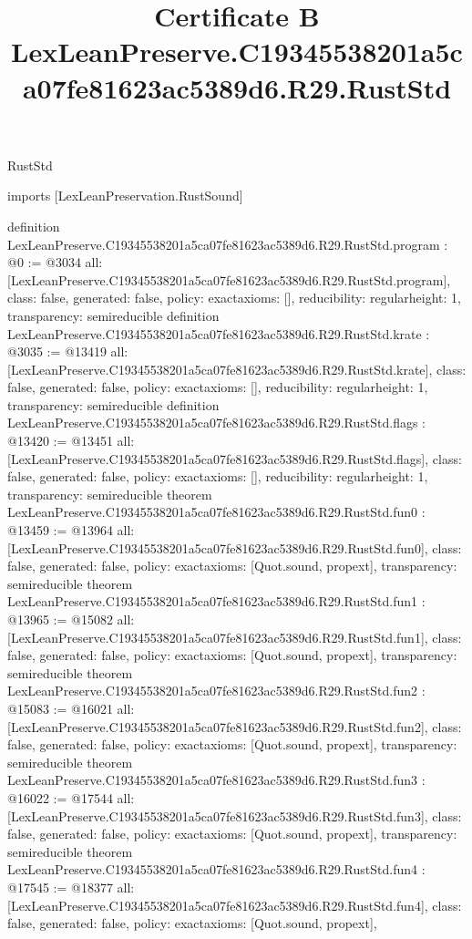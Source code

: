 \begin{lexlean}{RustStd}
\title{Certificate B LexLeanPreserve.C19345538201a5ca07fe81623ac5389d6.R29.RustStd}
\begin{coremodule}
imports [LexLeanPreservation.RustSound]

definition LexLeanPreserve.C19345538201a5ca07fe81623ac5389d6.R29.RustStd.program : @0 := @3034 {
  all: [LexLeanPreserve.C19345538201a5ca07fe81623ac5389d6.R29.RustStd.program],
  class: false,
  generated: false,
  policy: exact{axioms: []},
  reducibility: regular{height: 1},
  transparency: semireducible
}
definition LexLeanPreserve.C19345538201a5ca07fe81623ac5389d6.R29.RustStd.krate : @3035 := @13419 {
  all: [LexLeanPreserve.C19345538201a5ca07fe81623ac5389d6.R29.RustStd.krate],
  class: false,
  generated: false,
  policy: exact{axioms: []},
  reducibility: regular{height: 1},
  transparency: semireducible
}
definition LexLeanPreserve.C19345538201a5ca07fe81623ac5389d6.R29.RustStd.flags : @13420 := @13451 {
  all: [LexLeanPreserve.C19345538201a5ca07fe81623ac5389d6.R29.RustStd.flags],
  class: false,
  generated: false,
  policy: exact{axioms: []},
  reducibility: regular{height: 1},
  transparency: semireducible
}
theorem LexLeanPreserve.C19345538201a5ca07fe81623ac5389d6.R29.RustStd.fun0 : @13459 := @13964 {
  all: [LexLeanPreserve.C19345538201a5ca07fe81623ac5389d6.R29.RustStd.fun0],
  class: false,
  generated: false,
  policy: exact{axioms: [Quot.sound, propext]},
  transparency: semireducible
}
theorem LexLeanPreserve.C19345538201a5ca07fe81623ac5389d6.R29.RustStd.fun1 : @13965 := @15082 {
  all: [LexLeanPreserve.C19345538201a5ca07fe81623ac5389d6.R29.RustStd.fun1],
  class: false,
  generated: false,
  policy: exact{axioms: [Quot.sound, propext]},
  transparency: semireducible
}
theorem LexLeanPreserve.C19345538201a5ca07fe81623ac5389d6.R29.RustStd.fun2 : @15083 := @16021 {
  all: [LexLeanPreserve.C19345538201a5ca07fe81623ac5389d6.R29.RustStd.fun2],
  class: false,
  generated: false,
  policy: exact{axioms: [Quot.sound, propext]},
  transparency: semireducible
}
theorem LexLeanPreserve.C19345538201a5ca07fe81623ac5389d6.R29.RustStd.fun3 : @16022 := @17544 {
  all: [LexLeanPreserve.C19345538201a5ca07fe81623ac5389d6.R29.RustStd.fun3],
  class: false,
  generated: false,
  policy: exact{axioms: [Quot.sound, propext]},
  transparency: semireducible
}
theorem LexLeanPreserve.C19345538201a5ca07fe81623ac5389d6.R29.RustStd.fun4 : @17545 := @18377 {
  all: [LexLeanPreserve.C19345538201a5ca07fe81623ac5389d6.R29.RustStd.fun4],
  class: false,
  generated: false,
  policy: exact{axioms: [Quot.sound, propext]},
}
\end{coremodule}
\end{lexlean}
